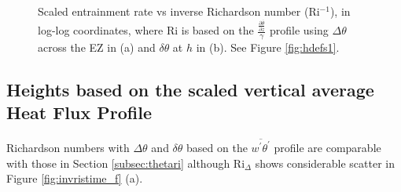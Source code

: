 \begin{figure}[htbp]
\begin{minipage}[b]{0.5\linewidth}
        \\
        \end{minipage}             
\quad
\begin{minipage}[b]{0.5\linewidth}
        \\       
       \end{minipage}
        \caption[Scaled entrainment rate vs inverse Richardson number]{Scaled entrainment rate vs inverse Richardson number (\acs{Ri}$^{-1}$), in log-log coordinates, where \acs{Ri} is based on the $\frac{\frac{\partial \overline{\theta}}{\partial z}}{\gamma}$ profile using $\Delta \theta$ across the \acs{EZ} in (a) and $\delta \theta$ at $h$ in (b). See Figure \ref{fig:hdefs1}.}
        \label{fig:weinvri}
\end{figure}

\clearpage

\subsection{Heights based on the scaled vertical average Heat Flux Profile}

Richardson numbers with $\Delta \theta$ and $\delta \theta$ based on the $\overline{w^{'}\theta^{'}}$ profile are comparable with those in Section \ref{subsec:thetari} although \acs{Ri}$_{\Delta}$ shows considerable scatter in Figure \ref{fig:invristime_f} (a).

